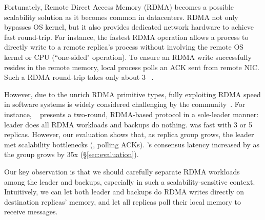 Fortunately, Remote Direct Access Memory (RDMA) becomes a possible scalability 
solution as it becomes common in datacenters. RDMA not only bypasses OS 
kernel, but it also provides dedicated network hardware to achieve fast 
round-trip. For instance, the fastest RDMA operation allows a process to 
directly write to a remote replica's process without involving the remote OS 
kernel or CPU (``one-sided" operation). To ensure an RDMA write successfully 
resides in the remote memory, local process polls an ACK sent from remote NIC. 
Such a RDMA round-trip takes only about 3 \us~\cite{pilaf:usenix14}.


However, due to the unrich RDMA primitive types, fully exploiting RDMA
speed in software systems is widely considered 
challenging by the community~\cite{pilaf:usenix14,herd:sigcomm14,
farm:sosp15,dare:hpdc15}. For instance, \dare~\cite{dare:hpdc15} presents a
two-round, RDMA-based \paxos protocol in a sole-leader manner: leader does all 
RDMA workloads and backups do nothing. \dare was fast with 3 or 5 
replicas. However, our evaluation shows that, as replica group grows, the 
leader met scalability bottlenecks (\eg, polling ACKs). \dare's consensus 
latency increased by \darescalability as the group grows by 35x
(\S\ref{sec:evaluation}).



Our key observation is that we should carefully separate RDMA workloads among
the leader and backups, especially in such a scalability-sensitive 
context. Intuitively, we can let both leader and backups do RDMA writes 
directly on destination replicas' memory, and let all replicas poll their 
local memory to receive messages.

